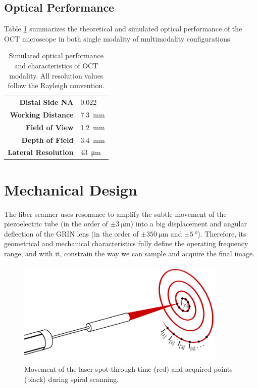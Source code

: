 \subsection{Optical Performance}

Table \ref{tab:simRes} summarizes the theoretical and simulated optical performance of the OCT microscope in both single modality of multimodality configurations.

\begin{table}[h!]\centering
	\begin{tabular}{rl}\\
		\hline
		\textbf{Distal Side NA} & 0.022 \\ 
		\textbf{Working Distance} & \SI{7.3}{\milli\meter} \\ 
		\textbf{Field of View} & \SI{1.2}{\milli\meter} \\ 
		\textbf{Depth of Field} & \SI{3.4}{\milli\meter} \\ 
		\textbf{Lateral Resolution} & \SI{43}{\micro\meter} \\ 
		\hline
	\end{tabular} 
    \caption{Simulated optical performance and characteristics of OCT modality. All resolution values follow the Rayleigh convention.}
    \label{tab:simRes}
\end{table}






\section{Mechanical Design}
\label{sec:mechDesign}

The fiber scanner uses resonance to amplify the subtle movement of the piezoelectric tube (in the order of $\pm \SI{3}{\micro\meter}$) into a big displacement and angular deflection of the GRIN lens (in the order of $\pm \SI{350}{\micro\meter}$ and  $\pm \SI{5}{\degree}$). Therefore, its geometrical and mechanical characteristics fully define the operating frequency range, and with it, constrain the way we can sample and acquire the final image.

\begin{figure}[h!]\centering
      \includegraphics[width=10cm]{figures/30_DesignSimulation/Mechanical/spiralScanning.pdf}
      \caption{Movement of the laser spot through time (red) and acquired points (black) during spiral scanning.}
      \label{fig:spiralScanning}
\end{figure}

